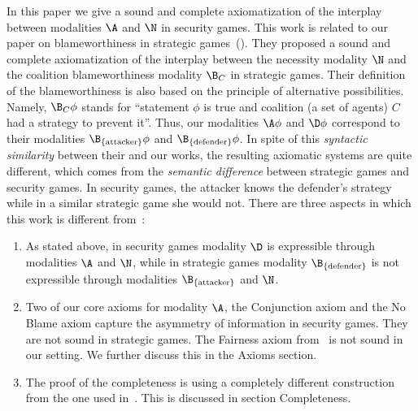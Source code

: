 \documentclass[letterpaper]{article}
\begin{document}
In this paper we give a sound and complete axiomatization of the interplay between modalities $\A$ and $\N$ in security games. This work is related to our paper on blameworthiness in strategic games~(\citeyear{nt19aaai}). 
They proposed a sound and complete axiomatization of the interplay between the necessity modality $\N$ and the coalition blameworthiness modality $\B_C$ in strategic games. Their definition of the blameworthiness is also based on the principle of alternative possibilities.
Namely, $\B_C\phi$ stands for ``statement $\phi$ is true and coalition (a set of agents)  $C$ had a strategy to prevent it''. Thus, our modalities $\A\phi$ and $\D\phi$ correspond to their modalities $\B_{\{\mbox{\scriptsize attacker}\}}\phi$ and $\B_{\{\mbox{\scriptsize defender}\}}\phi$. %
In spite of this {\em syntactic similarity} between their and our works, the resulting axiomatic systems are quite different, which comes from the {\em semantic difference} between strategic games and security games. In security games, the attacker knows the defender's strategy while in a similar strategic game she would not. There are three aspects in which this work is different from~\cite{nt19aaai}: 
\begin{enumerate}
    \item As stated above, in security games modality $\D$ is expressible through modalities $\A$ and $\N$, while in strategic games modality $\B_{\{\mbox{\scriptsize defender}\}}$ is not expressible through modalities $ \B_{\{\mbox{\scriptsize attacker}\}}$ and $\N$.
    \item Two of our core axioms for modality $\A$, the Conjunction axiom and the No Blame axiom capture the asymmetry of information in security games. They are not sound in strategic games. The Fairness axiom from~\cite{nt19aaai} is not sound in our setting. We further discuss this in the Axioms section.
    \item The proof of the completeness is using a completely different construction from the one used in~\cite{nt19aaai}. This is discussed in section Completeness. 
\end{enumerate}    

\end{document}
